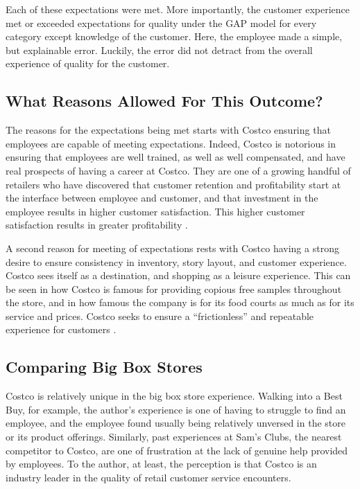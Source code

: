 \documentclass[man]{apa7}
\begin{document}
Each of these expectations were met. More importantly, the customer experience met or exceeded expectations for quality under the GAP model for every category except knowledge of the customer. Here, the employee made a simple, but explainable error. Luckily, the error did not detract from the overall experience of quality for the customer.


\subsection{What Reasons Allowed For This Outcome?}
\label{sec:org684b5d6}

The reasons for the expectations being met starts with Costco ensuring that employees are capable of meeting expectations. Indeed, Costco is notorious in ensuring that employees are well trained, as well as well compensated, and have real prospects of having a career at Costco. They are one of a growing handful of retailers who have discovered that customer retention and profitability start at the interface between employee and customer, and that investment in the employee results in higher customer satisfaction. This higher customer satisfaction results in greater profitability \parencite{tonWhyGoodJobs2012}.

A second reason for meeting of expectations rests with Costco having a strong desire to ensure consistency in inventory, story layout, and customer experience. Costco sees itself as a destination, and shopping as a leisure experience. This can be seen in how Costco is famous for providing copious free samples throughout the store, and in how famous the company is for its food courts as much as for its service and prices. Costco seeks to ensure a ``frictionless'' and repeatable experience for customers \parencite{williamsPractitionersPathCustomer2020}.


\subsection{Comparing Big Box Stores}
\label{sec:org4a69007}

Costco is relatively unique in the big box store experience. Walking into a Best Buy, for example, the author's experience is one of having to struggle to find an employee, and the employee found usually being relatively unversed in the store or its product offerings. Similarly, past experiences at Sam's Clubs, the nearest competitor to Costco, are one of frustration at the lack of genuine help provided by employees. To the author, at least, the perception is that Costco is an industry leader in the quality of retail customer service encounters.
\end{document}
